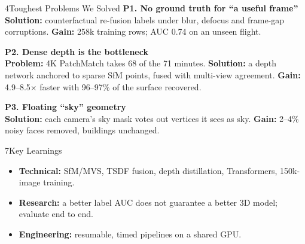 \documentclass{article}
\newcommand{\subhead}[1]{{\color{iitmaroon}\bfseries #1}}
\begin{document}
\begin{minipage}[t]{0.488\textwidth}
\begin{posterblock}{4}{Toughest Problems We Solved}
\subhead{P1. No ground truth for ``a useful frame''}\\
\textbf{Solution:} counterfactual re-fusion labels under blur, defocus and frame-gap corruptions.
\textbf{Gain:} 258k training rows; AUC 0.74 on an unseen flight.

\vspace{0.2em}
\subhead{P2. Dense depth is the bottleneck}\\
\textbf{Problem:} 4K PatchMatch takes 68 of the 71 minutes.
\textbf{Solution:} a depth network anchored to sparse SfM points, fused with multi-view agreement.
\textbf{Gain:} 4.9--8.5$\times$ faster with 96--97\% of the surface recovered.

\vspace{0.2em}
\subhead{P3. Floating ``sky'' geometry}\\
\textbf{Solution:} each camera's sky mask votes out vertices it sees as sky.
\textbf{Gain:} 2--4\% noisy faces removed, buildings unchanged.
\end{posterblock}

\begin{posterblock}{7}{Key Learnings}
\begin{itemize}
  \item \textbf{Technical:} SfM/MVS, TSDF fusion, depth distillation, Transformers, 150k-image training.
  \item \textbf{Research:} a better label AUC does not guarantee a better 3D model; evaluate end to end.
  \item \textbf{Engineering:} resumable, timed pipelines on a shared GPU.
\end{itemize}
\end{posterblock}
\end{minipage}%
\hfill
\end{document}
